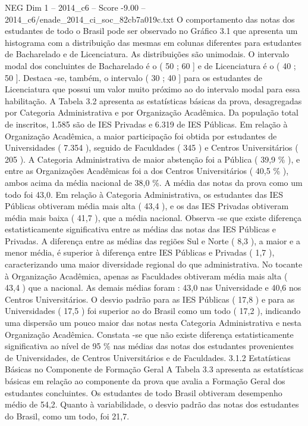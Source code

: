 \begin{textsample}{NEG Dim 1 – 2014\_c6 – Score -9.00 – 2014\_c6/enade\_2014\_ci\_soc\_82cb7a019c.txt}
O comportamento das notas dos estudantes de todo o Brasil pode ser observado no Gráfico 3.1 que apresenta um histograma com a distribuição das mesmas em colunas diferentes para estudantes de Bacharelado e de Licenciatura.
As distribuições são unimodais.
O intervalo modal dos concluintes de Bacharelado é o ( 50 ; 60 ] e de Licenciatura é o ( 40 ; 50 ].
Destaca -se, também, o intervalo ( 30 ; 40 ] para os estudantes de Licenciatura que possui um valor muito próximo ao do intervalo modal para essa habilitação.
A Tabela 3.2 apresenta as estatísticas básicas da prova, desagregadas por Categoria Administrativa e por Organização Acadêmica.
Da população total de inscritos, 1.585 são de IES Privadas e 6.319 de IES Públicas.
Em relação à Organização Acadêmica, a maior participação foi obtida por estudantes de Universidades ( 7.354 ), seguido de Faculdades ( 345 ) e Centros Universitários ( 205 ).
A Categoria Administrativa de maior abstenção foi a Pública ( 39,9 \% ), e entre as Organizações Acadêmicas foi a dos Centros Universitários ( 40,5 \% ), ambos acima da média nacional de 38,0 \%.
A média das notas da prova como um todo foi 43,0.
Em relação à Categoria Administrativa, os estudantes das IES Públicas obtiveram média mais alta ( 43,4 ), e os das IES Privadas obtiveram média mais baixa ( 41,7 ), que a média nacional.
Observa -se que existe diferença estatisticamente significativa entre as médias das notas das IES Públicas e Privadas.
A diferença entre as médias das regiões Sul e Norte ( 8,3 ), a maior e a menor média, é superior à diferença entre IES Públicas e Privadas ( 1,7 ), caracterizando uma maior diversidade regional do que administrativa.
No tocante à Organização Acadêmica, apenas as Faculdades obtiveram média mais alta ( 43,4 ) que a nacional.
As demais médias foram : 43,0 nas Universidade e 40,6 nos Centros Universitários.
O desvio padrão para as IES Públicas ( 17,8 ) e para as Universidades ( 17,5 ) foi superior ao do Brasil como um todo ( 17,2 ), indicando uma dispersão um pouco maior das notas nesta Categoria Administrativa e nesta Organização Acadêmica.
Constata -se que não existe diferença estatisticamente significativa ao nível de 95 \% nas médias das notas dos estudantes provenientes de Universidades, de Centros Universitários e de Faculdades. 3.1.2 Estatísticas Básicas no Componente de Formação Geral A Tabela 3.3 apresenta as estatísticas básicas em relação ao componente da prova que avalia a Formação Geral dos estudantes concluintes.
Os estudantes de todo Brasil obtiveram desempenho médio de 54,2.
Quanto à variabilidade, o desvio padrão das notas dos estudantes do Brasil, como um todo, foi 21,7.

\end{textsample}
